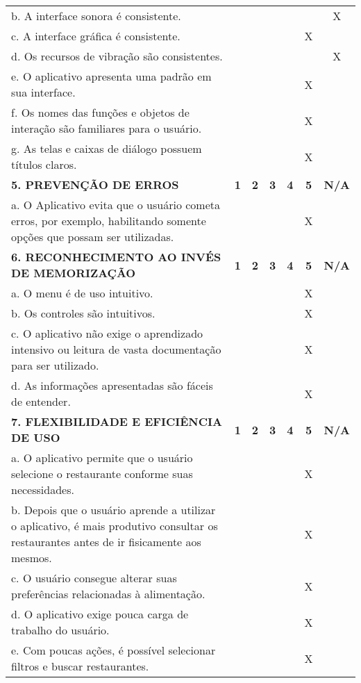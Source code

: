 \documentclass[portuguese,oneside]{tcc}
\begin{document}
\begin{center}
\begin{longtabu}{|L{25em}|c|c|c|c|c|c|}
b. A interface sonora é consistente. & & & & & & X \\ 
c. A interface gráfica é consistente. & & & & & X & \\ 
d. Os recursos de vibração são consistentes. & & & & & & X \\ 
e. O aplicativo apresenta uma padrão em sua interface. & & & & & X & \\ 
f. Os nomes das funções e objetos de interação são familiares para o usuário. & & & & & X & \\ 
g. As telas e caixas de diálogo possuem títulos claros. & & & & & X & \\ 
\textbf{5. PREVENÇÃO DE ERROS} & \textbf{1} & \textbf{2} & \textbf{3} & \textbf{4} & \textbf{5} & \textbf{N/A} \\ 
a. O Aplicativo evita que o usuário cometa erros, por exemplo, habilitando somente opções que possam ser utilizadas. & & & & & X & \\ 
\textbf{6. RECONHECIMENTO AO INVÉS DE MEMORIZAÇÃO} & \textbf{1} & \textbf{2} & \textbf{3} & \textbf{4} & \textbf{5} & \textbf{N/A} \\ 
a. O  menu é de uso intuitivo. & & & & & X & \\ 
b. Os controles são intuitivos. & & & & & X & \\ 
c. O aplicativo não exige o aprendizado intensivo ou leitura de vasta documentação para ser utilizado. & & & & & X & \\ 
d. As informações apresentadas são fáceis de entender. & & & & & X & \\ 
\textbf{7. FLEXIBILIDADE E EFICIÊNCIA DE USO} & \textbf{1} & \textbf{2} & \textbf{3} & \textbf{4} & \textbf{5} & \textbf{N/A} \\ 
a. O aplicativo permite que o usuário selecione o restaurante conforme suas necessidades. & & & & & X & \\ 
b. Depois que o usuário aprende a utilizar o aplicativo, é mais produtivo consultar os restaurantes antes de ir fisicamente aos mesmos. & & & & & X & \\ 
c. O usuário consegue alterar suas preferências relacionadas à alimentação. & & & & & X & \\ 
d. O aplicativo exige pouca carga de trabalho do usuário. & & & & & X & \\ 
e. Com poucas ações, é possível selecionar filtros e buscar restaurantes. & & & & & X & \\ 

\end{longtabu}
\end{center}
\end{document}
